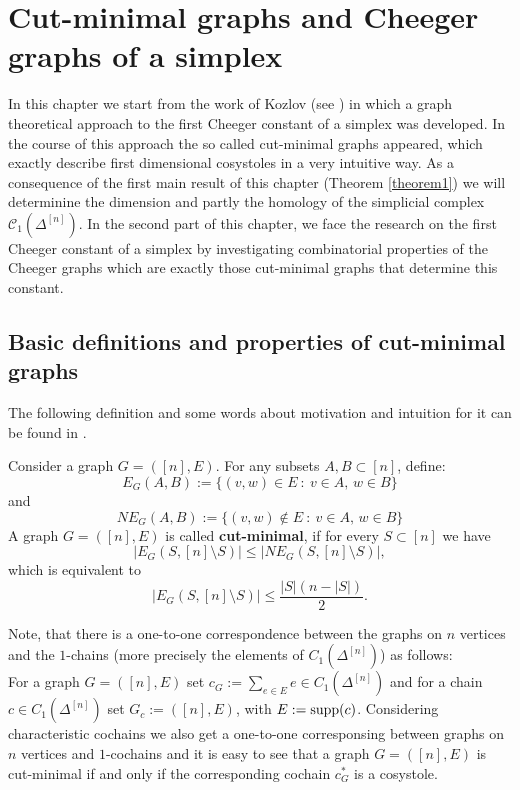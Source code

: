 
\chapter{Cut-minimal graphs and Cheeger graphs of a simplex}

\label{Chapter3}

In this chapter we start from the work of Kozlov (see \cite{1}) in which a graph theoretical approach to the first Cheeger constant of a simplex was developed. In the course of this approach the so called cut-minimal graphs appeared, which exactly describe first dimensional cosystoles in a very intuitive way. As a consequence of the first main result of this chapter (Theorem \ref{theorem1}) we will determinine the dimension and partly the homology of the simplicial complex \(\mathcal{C}_1(\Delta^{[n]})\). In the second part of this chapter, we face the research on the first Cheeger constant of a simplex by investigating combinatorial properties of the Cheeger graphs which are exactly those cut-minimal graphs that determine this constant.

\section{Basic definitions and properties of cut-minimal graphs}
The following definition and some words about motivation and intuition for it can be found in \cite{1}.

\begin{defi}
Consider a graph \(G=([n],E)\). For any subsets \(A,B\subset [n]\), define:
\[
E_G(A,B):=\{(v,w)\in E\: :\: v\in A\text{, }w\in B\}
\]
and
\[
NE_G(A,B):=\{(v,w)\notin E\: :\: v\in A\text{, }w\in B\}
\]
A graph \(G=([n],E)\) is called \textbf{cut-minimal}, if for every \(S\subset[n]\) we have
\[
|E_G(S,[n]\setminus S)|\leq |NE_G(S,[n]\setminus S)|,
\]
which is equivalent to
\[
|E_G(S,[n]\setminus S)|\leq\frac{|S|(n-|S|)}{2}.
\]
\end{defi}

Note, that there is a one-to-one correspondence between the graphs on \(n\) vertices and the \(1\)-chains (more precisely the elements of \(C_1(\Delta^{[n]})\)) as follows:\\
For a graph \(G=([n],E)\) set \(c_G:=\sum\limits_{e\in E}e\in C_1(\Delta^{[n]})\) and for a chain \(c\in C_1(\Delta^{[n]})\) set \(G_c:=([n],E)\), with \(E:=\mathrm{supp}(c)\). Considering characteristic cochains we also get a one-to-one corresponsing between graphs on \(n\) vertices and \(1\)-cochains and it is easy to see that a graph \(G=([n],E)\) is cut-minimal if and only if the corresponding cochain \(c_G^*\) is a cosystole.

